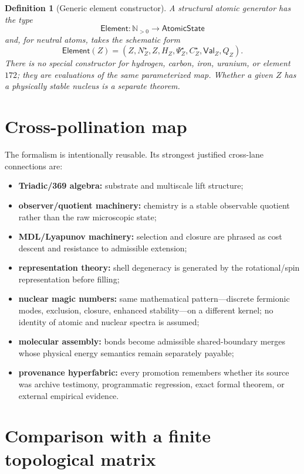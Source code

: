 \documentclass[11pt,a4paper]{article}
\newtheorem{definition}{Definition}[section]
\theoremstyle{remark}
\newcommand{\Val}{\mathsf{Val}}
\newcommand{\Elem}{\mathsf{Element}}
\newcommand{\Nat}{\mathbb N}
\begin{document}
\begin{definition}[Generic element constructor]
A structural atomic generator has the type
\[
 \boxed{\Elem:\Nat_{>0}\longrightarrow\mathsf{AtomicState}}
\]
and, for neutral atoms, takes the schematic form
\[
 \Elem(Z)=
 (Z,N_Z^\star,Z,H_Z,\Psi_Z^\star,C_Z^\star,\Val_Z,Q_Z).
\]
There is no special constructor for hydrogen, carbon, iron, uranium, or element
$172$; they are evaluations of the same parameterized map.  Whether a given $Z$
has a physically stable nucleus is a separate theorem.
\end{definition}

\section{Cross-pollination map}

The formalism is intentionally reusable.  Its strongest justified cross-lane
connections are:
\begin{itemize}
\item \textbf{Triadic/369 algebra:} substrate and multiscale lift structure;
\item \textbf{observer/quotient machinery:} chemistry is a stable observable
quotient rather than the raw microscopic state;
\item \textbf{MDL/Lyapunov machinery:} selection and closure are phrased as
cost descent and resistance to admissible extension;
\item \textbf{representation theory:} shell degeneracy is generated by the
rotational/spin representation before filling;
\item \textbf{nuclear magic numbers:} same mathematical pattern---discrete
fermionic modes, exclusion, closure, enhanced stability---on a different
kernel; no identity of atomic and nuclear spectra is assumed;
\item \textbf{molecular assembly:} bonds become admissible shared-boundary
merges whose physical energy semantics remain separately payable;
\item \textbf{provenance hyperfabric:} every promotion remembers whether its
source was archive testimony, programmatic regression, exact formal theorem,
or external empirical evidence.
\end{itemize}

\section{Comparison with a finite topological matrix}
\end{document}
